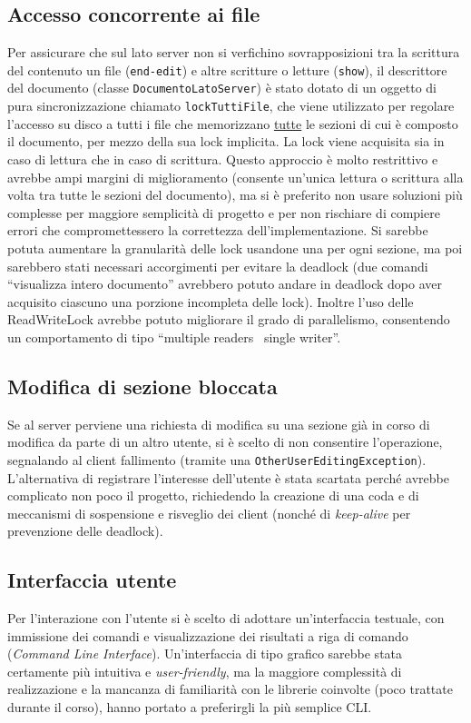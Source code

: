 \documentclass[a4paper,12pt]{article}
\begin{document}
 \subsection*{ Accesso concorrente ai file }
 Per assicurare che sul lato server non si verfichino sovrapposizioni tra la scrittura del contenuto un file (\texttt{end-edit}) e altre scritture o letture (\texttt{show}), il descrittore del documento (classe \texttt{DocumentoLatoServer}) è stato dotato di un oggetto di pura sincronizzazione chiamato \texttt{lockTuttiFile}, che viene utilizzato per regolare l'accesso su disco a tutti i file che memorizzano \underline{tutte} le sezioni di cui è composto il documento, per mezzo della sua lock implicita. La lock viene acquisita sia in caso di lettura che in caso di scrittura. Questo approccio è molto restrittivo e avrebbe ampi margini di miglioramento (consente un'unica lettura o scrittura alla volta tra tutte le sezioni del documento), ma si è preferito non usare soluzioni più complesse per maggiore semplicità di progetto e per non rischiare di compiere errori che compromettessero la correttezza dell'implementazione. Si sarebbe potuta aumentare la granularità delle lock usandone una per ogni sezione, ma poi sarebbero stati necessari accorgimenti per evitare la deadlock (due comandi ``visualizza intero documento'' avrebbero potuto andare in deadlock dopo aver acquisito ciascuno una porzione incompleta delle lock). Inoltre l'uso delle ReadWriteLock avrebbe potuto migliorare il grado di parallelismo, consentendo un comportamento di tipo ``multiple readers \textendash\ single writer''.
 
 \subsection*{ Modifica di sezione bloccata }
 Se al server perviene una richiesta di modifica su una sezione già in corso di modifica da parte di un altro utente, si è scelto di non consentire l'operazione, segnalando al client fallimento (tramite una \texttt{OtherUserEditingException}). L'alternativa di registrare l'interesse dell'utente è stata scartata perché avrebbe complicato non poco il progetto, richiedendo la creazione di una coda e di meccanismi di sospensione e risveglio dei client (nonché di \textit{keep-alive} per prevenzione delle deadlock).
 
 \subsection*{ Interfaccia utente }
 Per l'interazione con l'utente si è scelto di adottare un'interfaccia testuale, con immissione dei comandi e visualizzazione dei risultati a riga di comando (\textit{Command Line Interface}). Un'interfaccia di tipo grafico sarebbe stata certamente più intuitiva e \textit{user-friendly}, ma la maggiore complessità di realizzazione e la mancanza di familiarità con le librerie coinvolte (poco trattate durante il corso), hanno portato a preferirgli la più semplice CLI.
 
\end{document}
